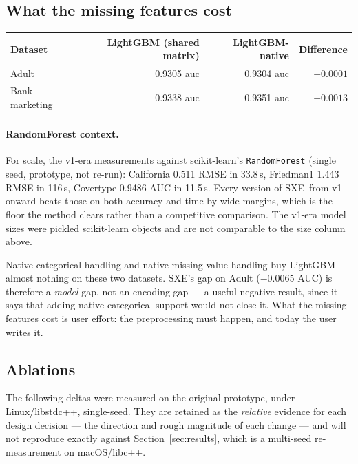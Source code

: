 \documentclass[11pt,a4paper]{article}
\newcommand{\code}[1]{\texttt{\small #1}}
\newcommand{\SXE}{\textsc{SXE}}
\theoremstyle{definition}
\begin{document}
\subsection{What the missing features cost}

\begin{center}
\begin{tabular}{lrrr}
\toprule
Dataset & LightGBM (shared matrix) & LightGBM-native & Difference \\
\midrule
Adult          & 0.9305 auc & 0.9304 auc & $-0.0001$ \\
Bank marketing & 0.9338 auc & 0.9351 auc & $+0.0013$ \\
\bottomrule
\end{tabular}
\end{center}

\paragraph{RandomForest context.} For scale, the v1-era measurements against
scikit-learn's \code{RandomForest} (single seed, prototype, not re-run):
California 0.511 RMSE in 33.8\,s, Friedman1 1.443 RMSE in 116\,s, Covertype
0.9486 AUC in 11.5\,s. Every version of \SXE\ from v1 onward beats those on
both accuracy and time by wide margins, which is the floor the method clears
rather than a competitive comparison. The v1-era model sizes were pickled
scikit-learn objects and are not comparable to the size column above.

\medskip
Native categorical handling and native missing-value handling buy LightGBM
almost nothing on these two datasets. \SXE's gap on Adult ($-0.0065$ AUC) is
therefore a \emph{model} gap, not an encoding gap --- a useful negative result,
since it says that adding native categorical support would not close it. What
the missing features cost is user effort: the preprocessing must happen, and
today the user writes it.

\subsection{Ablations}

The following deltas were measured on the original prototype, under
Linux/libstdc++, single-seed. They are retained as the \emph{relative} evidence
for each design decision --- the direction and rough magnitude of each change
--- and will not reproduce exactly against Section~\ref{sec:results}, which is
a multi-seed re-measurement on macOS/libc++.
\end{document}

